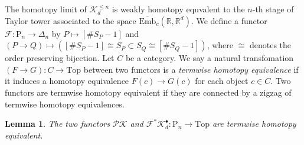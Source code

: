 \documentclass[reqno]{amsart}
\theoremstyle{definition}
\theoremstyle{plain}
\newtheorem{lem}[defi]{Lemma}
\newcommand{\PK}{\mathcal{PK}} %
\newcommand{\KK}{\mathcal{K}}%
\newcommand{\CG}{\mathrm{Top}}%
\newcommand{\Embbar}{\overline{\mathrm{Emb}}}
\newcommand{\RR}{\mathbb{R}}
\newcommand{\PP}{\mathrm{P}} %
\begin{document}
The homotopy limit of $\KK_d^{\leq n}$ is weakly homotopy equvalent to the $n$-th stage of Taylor tower associated to the space $\Embbar_c(\RR,\RR^d)$. We define a functor $\mathcal{F}:\PP_n\to \Delta_n$ by $P\mapsto [\# S_P-1]$ and $(P\to Q)\mapsto ([\# S_P-1]\cong S_P\subset S_Q\cong [\# S_Q-1])$, where $\cong$ denotes the order preserving bijection.
Let $C$ be a category. We say a natural transfomation  $(F\rightarrow G):C \to \CG$ between two functors  is a {\em termwise homotopy equivalence} if it induces a homotopy equivalence $F(c)\to G(c)$ for each object $c\in C$. Two functors are termwise homotopy equivalent if they are connected by a zigzag of termwise homotopy equivalences.
\begin{lem}\label{LPK}
The two functors $\PK$ and $\mathcal{F}^*\KK_d^\bullet :\PP_n\to \CG$ are termwise homotopy equivalent. 

\end{lem}
\end{document}
